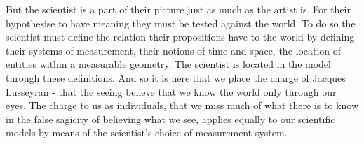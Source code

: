 

%
%
%
%
%
%
%
%
%

But the scientist is a part of their picture just as much as the artist is.
For their hypothesise to have meaning they must be tested against the world.
To do so the scientist must define the relation their propositions have to the world by defining their systems of measurement, their notions of time and space,
the location of entities within a measurable geometry.  The scientist is located in the model through these definitions.
And so it is here that we place the charge of Jacques Lusseyran - that the seeing believe that we know the world only through our eyes.
The charge to us as individuals, that we miss much of what there is to know in the false sagicity of believing what we see, 
applies equally to our scientific models by means of the scientist's choice of measurement system.

